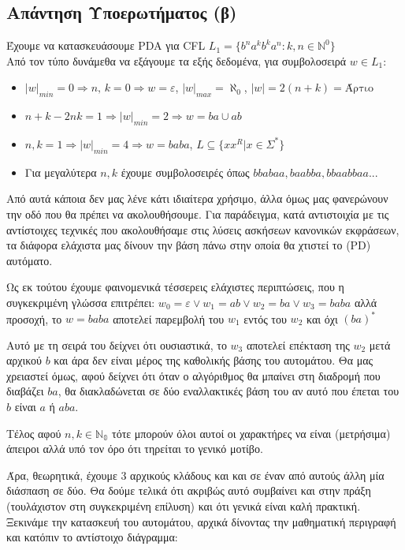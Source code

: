 \subsection{Απάντηση Υποερωτήματος (β)}
\label{ssec:Solution_2.2}
\doublespacing
Έχουμε να κατασκευάσουμε PDA για CFL $L_1 = \{b^n a^k b^k a^n : k, n \in  \mathbb{N}^0 \}$\\
Από τον τύπο δυνάμεθα να εξάγουμε τα εξής δεδομένα, για συμβολοσειρά $w \in L_1$:
\reducevspace\reducevspace\reducevspace\reducevspace\reducevspace\reducevspace
\begin{itemize}
	\itemsep0em
	\item $\vert w \vert_{min} = 0 \Longrightarrow n,\,k = 0 \Longrightarrow w = ε$, \quad $\vert w \vert_{max} =
	\aleph_0$, \quad $|w| = 2(n+k) = \text{Άρτιο}$
	\item $ n + k - 2nk = 1  \Longrightarrow |w|_{min} = 2 \Longrightarrow w = ba \cup ab$
	\item $ n, k = 1 \Longrightarrow \vert w \vert_{min} = 4 \Longrightarrow w = baba$, \qquad $L \subseteq \{xx^R
	\vert x \in \Sigma^* \}$
	\item Για μεγαλύτερα $n, k$ έχουμε συμβολοσειρές όπως $bbabaa, baabba, bbaabbaa...$
\end{itemize}
\reducevspace\reducevspace
\par
Από αυτά κάποια δεν μας λένε κάτι ιδιαίτερα χρήσιμο, άλλα όμως μας φανερώνουν την οδό που θα πρέπει να
ακολουθήσουμε. Για παράδειγμα, κατά αντιστοιχία με τις αντίστοιχες τεχνικές που ακολουθήσαμε στις
λύσεις ασκήσεων κανονικών εκφράσεων, τα διάφορα ελάχιστα μας δίνουν την βάση πάνω στην οποία θα χτιστεί το (PD)
αυτόματο.
\par
Ως εκ τούτου έχουμε φαινομενικά τέσσερεις ελάχιστες περιπτώσεις, που η
συγκεκριμένη γλώσσα επιτρέπει:
$w_0 = ε \lor w_1 = ab \lor w_2 = ba \lor w_3 = baba$ αλλά προσοχή, το $w = baba$
αποτελεί παρεμβολή του $w_1$ εντός του $w_2$ και όχι $(ba)^*$
\par
Αυτό με τη σειρά του δείχνει ότι ουσιαστικά, το $w_3$ αποτελεί επέκταση της $w_2$ μετά αρχικού $b$ και άρα δεν
είναι μέρος της καθολικής βάσης του αυτομάτου. Θα μας χρειαστεί όμως, αφού δείχνει ότι όταν ο
αλγόριθμος θα μπαίνει στη διαδρομή που διαβάζει $ba$, θα διακλαδώνεται σε δύο εναλλακτικές βάση του
αν αυτό που έπεται του $b$ είναι $a$ ή $aba$.
\par Τέλος αφού $n, k \in \mathbb{N_0}$ τότε μπορούν όλοι αυτοί οι χαρακτήρες να είναι (μετρήσιμα) άπειροι αλλά υπό
τον όρο ότι τηρείται το γενικό μοτίβο.
\par Άρα, θεωρητικά, έχουμε 3 αρχικούς κλάδους και  και σε έναν από αυτούς άλλη μία διάσπαση σε δύο. Θα δούμε
τελικά ότι ακριβώς αυτό συμβαίνει και στην πράξη (τουλάχιστον στη συγκεκριμένη επίλυση) και ότι γενικά είναι καλή
πρακτική. Ξεκινάμε την κατασκευή του αυτομάτου, αρχικά δίνοντας την μαθηματική περιγραφή και κατόπιν το αντίστοιχο
διάγραμμα:


